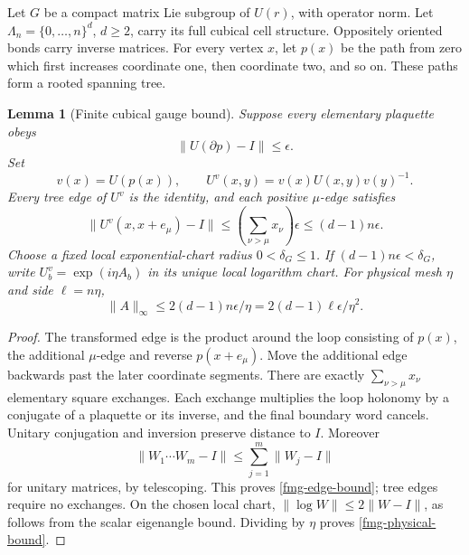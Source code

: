 \documentclass[11pt]{article}
\newtheorem{lemma}[theorem]{Lemma}
\theoremstyle{remark}
\begin{document}
Let \(G\) be a compact matrix Lie subgroup of \(U(r)\), with
operator norm. Let
\(\Lambda_n=\{0,\ldots,n\}^d\), \(d\ge2\), carry its full cubical
cell structure. Oppositely oriented bonds carry inverse matrices.
For every vertex \(x\), let \(p(x)\) be the path from zero which
first increases coordinate one, then coordinate two, and so on.
These paths form a rooted spanning tree.

\begin{lemma}[Finite cubical gauge bound]
\label{fmg-tree-lemma}
Suppose every elementary plaquette obeys
\begin{equation}
                  \|U(\partial p)-I\|\le\epsilon.
 \label{fmg-plaquette-bound}
\end{equation}
Set
\begin{equation}
 v(x)=U(p(x)),\qquad
 U^v(x,y)=v(x)U(x,y)v(y)^{-1}.
 \label{fmg-gauge}
\end{equation}
Every tree edge of \(U^v\) is the identity, and each positive
\(\mu\)-edge satisfies
\begin{equation}
 \|U^v(x,x+e_\mu)-I\|
       \le\left(\sum_{\nu>\mu}x_\nu\right)\epsilon
       \le(d-1)n\epsilon.
 \label{fmg-edge-bound}
\end{equation}
Choose a fixed local exponential-chart radius
\(0<\delta_G\le1\). If \((d-1)n\epsilon<\delta_G\), write
\(U^v_b=\exp(i\eta A_b)\) in its unique local logarithm chart.
For physical mesh \(\eta\) and side \(\ell=n\eta\),
\begin{equation}
 \|A\|_\infty
       \le 2(d-1)n\epsilon/\eta
       =2(d-1)\ell\epsilon/\eta^2 .
 \label{fmg-physical-bound}
\end{equation}
\end{lemma}

\begin{proof}
The transformed edge is the product around the loop consisting
of \(p(x)\), the additional \(\mu\)-edge and reverse \(p(x+e_\mu)\).
Move the additional edge backwards past the later coordinate
segments. There are exactly \(\sum_{\nu>\mu}x_\nu\) elementary
square exchanges. Each exchange multiplies the loop holonomy
by a conjugate of a plaquette or its inverse, and the final
boundary word cancels. Unitary conjugation and inversion
preserve distance to \(I\). Moreover
\[
       \|W_1\cdots W_m-I\|
                     \le\sum_{j=1}^m\|W_j-I\|
\]
for unitary matrices, by telescoping. This proves
\eqref{fmg-edge-bound}; tree edges require no exchanges.
On the chosen local chart,
\(\|\log W\|\le2\|W-I\|\), as follows from the scalar eigenangle
bound. Dividing by \(\eta\) proves \eqref{fmg-physical-bound}.
\end{proof}
\end{document}
